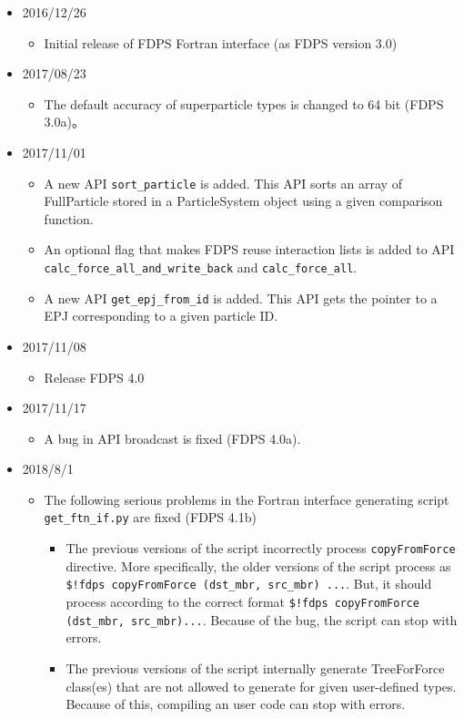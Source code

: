 
\begin{itemize}[leftmargin=*,itemsep=-1ex]

\item 2016/12/26
\begin{itemize}
\item Initial release of FDPS Fortran interface (as FDPS version 3.0)
\end{itemize}

\item 2017/08/23
\begin{itemize}
\item The default accuracy of superparticle types  is changed to 64 bit (FDPS 3.0a)。
\end{itemize}

\item 2017/11/01
\begin{itemize}
\item A new API \texttt{sort\_particle} is added. This API sorts an array of FullParticle stored in a ParticleSystem object using a given comparison function.
\item An optional flag that makes FDPS reuse interaction lists is added to API \texttt{calc\_force\_all\_and\_write\_back} and \texttt{calc\_force\_all}.
\item A new API \texttt{get\_epj\_from\_id} is added. This API gets the pointer to a EPJ corresponding to a given particle ID.
\end{itemize}

\item 2017/11/08
\begin{itemize}
\item Release FDPS 4.0
\end{itemize}

\item 2017/11/17
\begin{itemize}
\item A bug in API broadcast is fixed (FDPS 4.0a).
\end{itemize}

\item 2018/8/1
\begin{itemize}
\item The following serious problems in the Fortran interface generating script \texttt{get\_ftn\_if.py} are fixed (FDPS 4.1b)
\begin{itemize}
\item The previous versions of the script incorrectly process \texttt{copyFromForce} directive. More specifically, the older versions of the script process as \texttt{\$!fdps copyFromForce (dst\_mbr, src\_mbr) ...}. But, it should process according to the correct format \texttt{\$!fdps copyFromForce (dst\_mbr, src\_mbr)...}. Because of the bug, the script can stop with errors.
\item The previous versions of the script internally generate TreeForForce class(es) that are not allowed to generate for given user-defined types. Because of this, compiling an user code can stop with errors.
\end{itemize}
\end{itemize}


\end{itemize}
